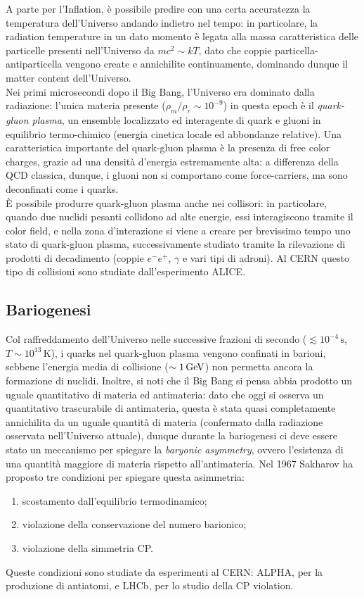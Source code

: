 A parte per l'Inflation, è possibile predire con una certa accuratezza la temperatura dell'Universo andando indietro nel tempo: in particolare, la radiation temperature in un dato momento è legata alla massa caratteristica delle particelle presenti nell'Universo da $ mc^2 \sim kT $, dato che coppie particella-antiparticella vengono create e annichilite continuamente, dominando dunque il matter content dell'Universo. \\
Nei primi microsecondi dopo il Big Bang, l'Universo era dominato dalla radiazione: l'unica materia presente ($ \rho_m / \rho_r \sim 10^{-9} $) in questa epoch è il \textit{quark-gluon plasma}, un ensemble localizzato ed interagente di quark e gluoni in equilibrio termo-chimico (energia cinetica locale ed abbondanze relative). Una caratteristica importante del quark-gluon plasma è la presenza di free color charges, grazie ad una densità d'energia estremamente alta: a differenza della QCD classica, dunque, i gluoni non si comportano come force-carriers, ma sono deconfinati come i quarks. \\
È possibile produrre quark-gluon plasma anche nei collisori: in particolare, quando due nuclidi pesanti collidono ad alte energie, essi interagiscono tramite il color field, e nella zona d'interazione si viene a creare per brevissimo tempo uno stato di quark-gluon plasma, successivamente studiato tramite la rilevazione di prodotti di decadimento (coppie $ e^- e^+ $, $ \gamma $ e vari tipi di adroni). Al CERN questo tipo di collisioni sono studiate dall'esperimento ALICE.

\subsection{Bariogenesi}

Col raffreddamento dell'Universo nelle successive frazioni di secondo ($ \lesssim 10^{-4} \,\text{s} $, $ T \sim 10^{13} \,\text{K} $), i quarks nel quark-gluon plasma vengono confinati in barioni, sebbene l'energia media di collisione ($ \sim 1 \,\mathrm{GeV} $) non permetta ancora la formazione di nuclidi. Inoltre, si noti che il Big Bang si pensa abbia prodotto un uguale quantitativo di materia ed antimateria: dato che oggi si osserva un quantitativo trascurabile di antimateria, questa è stata quasi completamente annichilita da un uguale quantità di materia (confermato dalla radiazione osservata nell'Universo attuale), dunque durante la bariogenesi ci deve essere stato un meccanismo per spiegare la \textit{baryonic asymmetry}, ovvero l'esistenza di una quantità maggiore di materia rispetto all'antimateria. Nel 1967 Sakharov ha proposto tre condizioni per spiegare questa asimmetria:
\begin{enumerate}
	\item scostamento dall'equilibrio termodinamico;
	\item violazione della conservazione del numero barionico;
	\item violazione della simmetria CP.
\end{enumerate}
Queste condizioni sono studiate da esperimenti al CERN: ALPHA, per la produzione di antiatomi, e LHCb, per lo studio della CP violation.

